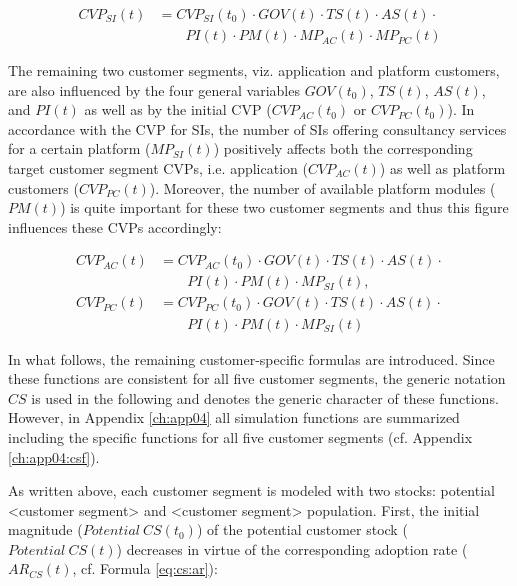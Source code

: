 \begin{align}
		CVP_{SI}(t) &= CVP_{SI}(t_0) \cdot GOV(t) \cdot TS(t) \cdot AS(t) \cdot \nonumber \\ &\qquad PI(t) \cdot PM(t) \cdot MP_{AC}(t) \cdot MP_{PC}(t)\label{eq:cvp:si}
\end{align}

The remaining two customer segments, viz. application and platform customers, are also influenced by the four general variables $GOV(t_0)$, $TS(t)$, $AS(t)$, and $PI(t)$ as well as by the initial \ac{CVP} ($CVP_{AC}(t_0)$ or $CVP_{PC}(t_0)$). In accordance with the \ac{CVP} for \acp{SI}, the number of \acp{SI} offering consultancy services for a certain platform ($MP_{SI}(t)$) positively affects both the corresponding target customer segment \acp{CVP}, i.e. application ($CVP_{AC}(t)$) as well as platform customers ($CVP_{PC}(t)$). Moreover, the number of available platform modules ($PM(t)$) is quite important for these two customer segments and thus this figure influences these \acp{CVP} accordingly:

\begin{align}
		CVP_{AC}(t) &= CVP_{AC}(t_0) \cdot GOV(t) \cdot TS(t) \cdot AS(t) \cdot \nonumber \\ &\qquad PI(t) \cdot PM(t) \cdot MP_{SI}(t),\label{eq:cvp:ac}\\
		CVP_ {PC}(t) &= CVP_{PC}(t_0) \cdot GOV(t) \cdot TS(t) \cdot AS(t) \cdot \nonumber \\ &\qquad PI(t) \cdot PM(t) \cdot MP_{SI}(t)\label{eq:cvp:pc}
\end{align}

In what follows, the remaining customer-specific formulas are introduced. Since these functions are consistent for all five customer segments, the generic notation $CS$ is used in the following and denotes the generic character of these functions. However, in Appendix \ref{ch:app04} all simulation functions are summarized including the specific functions for all five customer segments (cf. Appendix \ref{ch:app04:csf}).

As written above, each customer segment is modeled with two stocks: potential <customer segment> and <customer segment> population. First, the initial magnitude ($\mathit{Potential~CS(t_0)}$) of the potential customer stock \linebreak ($\mathit{Potential~CS(t)}$) decreases in virtue of the corresponding adoption rate \linebreak ($AR_{CS}(t)$, cf. Formula \ref{eq:cs:ar}):

